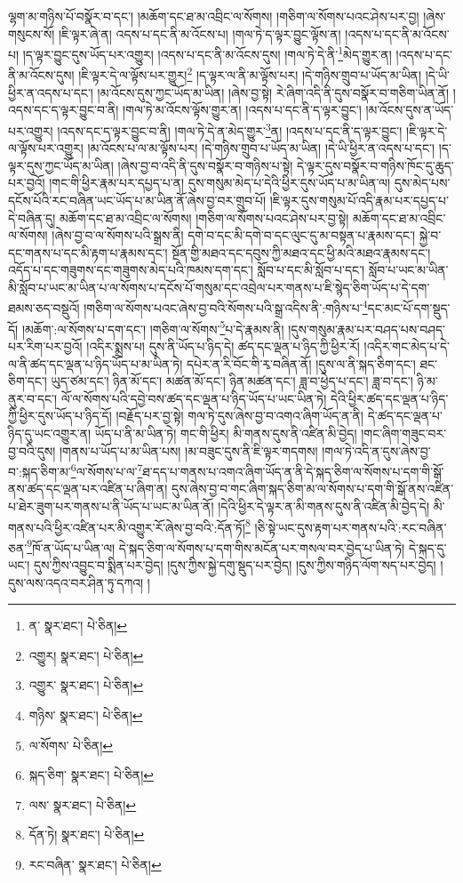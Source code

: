 ལྷག་མ་གཉིས་པོ་བསྣོར་བ་དང་། །མཆོག་དང་ཐ་མ་འབྲིང་ལ་སོགས། །གཅིག་ལ་སོགས་པའང་ཤེས་པར་བྱ། །ཞེས་གསུངས་སོ། །ཇི་ལྟར་ཞེ་ན། འདས་པ་དང་ནི་མ་འོངས་པ། །གལ་ཏེ་ད་ལྟར་བྱུང་ལྟོས་ན། །འདས་པ་དང་ནི་མ་འོངས་པ། །ད་ལྟར་བྱུང་དུས་ཡོད་པར་འགྱུར། །འདས་པ་དང་ནི་མ་འོངས་དུས། །གལ་ཏེ་དེ་ནི་\footnote{ན་  སྣར་ཐང་།  པེ་ཅིན། }མེད་གྱུར་ན། །འདས་པ་དང་ནི་མ་འོངས་དུས། །ཇི་ལྟར་དེ་ལ་ལྟོས་པར་གྱུར།\footnote{འགྱུར།  སྣར་ཐང་།  པེ་ཅིན། } །ད་ལྟར་ལ་ནི་མ་ལྟོས་པར། །དེ་གཉིས་གྲུབ་པ་ཡོད་མ་ཡིན། །དེ་ཡི་ཕྱིར་ན་འདས་པ་དང་། །མ་འོངས་དུས་ཀྱང་ཡོད་མ་ཡིན། །ཞེས་བྱ་སྟེ། རེ་ཞིག་འདི་ནི་དུས་བསྣོར་བ་གཅིག་ཡིན་ནོ། །འདས་དང་ད་ལྟར་བྱུང་བ་ནི། །གལ་ཏེ་མ་འོངས་ལྟོས་གྱུར་ན། །འདས་པ་དང་ནི་ད་ལྟར་བྱུང་། །མ་འོངས་དུས་ན་ཡོད་པར་འགྱུར། །འདས་དང་ད་ལྟར་བྱུང་བ་ནི། །གལ་ཏེ་དེ་ན་མེད་གྱུར་\footnote{འགྱུར་  སྣར་ཐང་།  པེ་ཅིན། }ན། །འདས་པ་དང་ནི་ད་ལྟར་བྱུང་། །ཇི་ལྟར་དེ་ལ་ལྟོས་པར་འགྱུར། །མ་འོངས་པ་ལ་མ་ལྟོས་པར། །དེ་གཉིས་གྲུབ་པ་ཡོད་མ་ཡིན། །དེ་ཡི་ཕྱིར་ན་འདས་པ་དང་། །ད་ལྟར་དུས་ཀྱང་ཡོད་མ་ཡིན། །ཞེས་བྱ་བ་འདི་ནི་དུས་བསྣོར་བ་གཉིས་པ་སྟེ། དེ་ལྟར་དུས་བསྣོར་བ་གཉིས་ཁོང་དུ་ཆུད་པར་བྱའོ། །གང་གི་ཕྱིར་རྣམ་པར་དཔྱད་པ་ན། དུས་གསུམ་མེད་པ་དེའི་ཕྱིར་དུས་ཡོད་པ་མ་ཡིན་ལ། དུས་མེད་པས་དངོས་པོའི་རང་བཞིན་ཡང་ཡོད་པ་མ་ཡིན་ནོ་ཞེས་བྱ་བར་གྲུབ་པོ། །ཇི་ལྟར་དུས་གསུམ་པོ་འདི་རྣམ་པར་དཔྱད་པ་དེ་བཞིན་དུ། མཆོག་དང་ཐ་མ་འབྲིང་ལ་སོགས། །གཅིག་ལ་སོགས་པའང་ཤེས་པར་བྱ་སྟེ། མཆོག་དང་ཐ་མ་འབྲིང་ལ་སོགས། །ཞེས་བྱ་བ་ལ་སོགས་པའི་སྒྲས་ནི། དགེ་བ་དང་མི་དགེ་བ་དང་ལུང་དུ་མ་བསྟན་པ་རྣམས་དང་། སྐྱེ་བ་དང་གནས་པ་དང་མི་རྟག་པ་རྣམས་དང་། སྔོན་གྱི་མཐའ་དང་དབུས་ཀྱི་མཐའ་དང་ཕྱི་མའི་མཐའ་རྣམས་དང་། འདོད་པ་དང་གཟུགས་དང་གཟུགས་མེད་པའི་ཁམས་དག་དང་། སློབ་པ་དང་མི་སློབ་པ་དང་། སློབ་པ་ཡང་མ་ཡིན་མི་སློབ་པ་ཡང་མ་ཡིན་པ་ལ་སོགས་པ་དངོས་པོ་གསུམ་དང་འབྲེལ་པར་གནས་པ་ཇི་སྙེད་ཅིག་ཡོད་པ་དེ་དག་ཐམས་ཅད་བསྡུའོ། །གཅིག་ལ་སོགས་པའང་ཞེས་བྱ་བའི་སོགས་པའི་སྒྲ་འདིས་ནི་:གཉིས་པ་\footnote{གཉིས་  སྣར་ཐང་།  པེ་ཅིན། }དང་མང་པོ་དག་སྡུད་དོ། །མཆོག་:ལ་སོགས་པ་དག་དང་། །གཅིག་ལ་སོགས་\footnote{ལ་སོགས་  པེ་ཅིན། }པ་དེ་རྣམས་ནི། །དུས་གསུམ་རྣམ་པར་བཤད་པས་བཤད་པར་རིག་པར་བྱའོ། །འདིར་སྨྲས་པ། དུས་ནི་ཡོད་པ་ཉིད་དེ། ཚད་དང་ལྡན་པ་ཉིད་ཀྱི་ཕྱིར་རོ། །འདིར་གང་མེད་པ་དེ་ལ་ནི་ཚད་དང་ལྡན་པ་ཉིད་ཡོད་པ་མ་ཡིན་ཏེ། དཔེར་ན་རི་བོང་གི་རྭ་བཞིན་ནོ། །དུས་ལ་ནི་སྐད་ཅིག་དང་། ཐང་ཅིག་དང་། ཡུད་ཙམ་དང་། ཉིན་མོ་དང་། མཚན་མོ་དང་། ཉིན་མཚན་དང་། ཟླ་བ་ཕྱེད་པ་དང་། ཟླ་བ་དང་། ཉི་མ་ནུར་བ་དང་། ལོ་ལ་སོགས་པའི་དབྱེ་བས་ཚད་དང་ལྡན་པ་ཉིད་ཡོད་པ་ཡང་ཡིན་ཏེ། དེའི་ཕྱིར་ཚད་དང་ལྡན་པ་ཉིད་ཀྱི་ཕྱིར་དུས་ཡོད་པ་ཉིད་དོ། །བརྗོད་པར་བྱ་སྟེ། གལ་ཏེ་དུས་ཞེས་བྱ་བ་འགའ་ཞིག་ཡོད་ན་ནི། དེ་ཚད་དང་ལྡན་པ་ཉིད་དུ་ཡང་འགྱུར་ན། ཡོད་པ་ནི་མ་ཡིན་ཏེ། གང་གི་ཕྱིར། མི་གནས་དུས་ནི་འཛིན་མི་བྱེད། །གང་ཞིག་གཟུང་བར་བྱ་བའི་དུས། །གནས་པ་ཡོད་པ་མ་ཡིན་པས། །མ་བཟུང་དུས་ནི་ཇི་ལྟར་གདགས། །གལ་ཏེ་འདི་ན་དུས་ཞེས་བྱ་བ་:སྐད་ཅིག་མ་\footnote{སྐད་ཅིག་  སྣར་ཐང་།  པེ་ཅིན། }ལ་སོགས་པ་ལ་\footnote{ལས་  སྣར་ཐང་།  པེ་ཅིན། }ཐ་དད་པ་གནས་པ་འགའ་ཞིག་ཡོད་ན་ནི་དེ་སྐད་ཅིག་ལ་སོགས་པ་དག་གི་སྒོ་ནས་ཚད་དང་ལྡན་པར་འཛིན་པ་ཞིག་ན། དུས་ཞེས་བྱ་བ་གང་ཞིག་སྐད་ཅིག་མ་ལ་སོགས་པ་དག་གི་སྒོ་ནས་འཛིན་པ་ཐེར་ཟུག་པར་གནས་པ་ནི་ཡོད་པ་ཡང་མ་ཡིན་ནོ། །དེའི་ཕྱིར་དེ་ལྟར་ན་མི་གནས་དུས་ནི་འཛིན་མི་བྱེད་དེ། མི་གནས་པའི་ཕྱིར་འཛིན་པར་མི་འགྱུར་རོ་ཞེས་བྱ་བའི་:དོན་ཏོ།\footnote{དོན་ཏེ།  སྣར་ཐང་།  པེ་ཅིན། } །ཅི་སྟེ་ཡང་དུས་རྟག་པར་གནས་པའི་:རང་བཞིན་ཅན་\footnote{རང་བཞིན་  སྣར་ཐང་།  པེ་ཅིན། }ཁོ་ན་ཡོད་པ་ཡིན་ལ། དེ་སྐད་ཅིག་ལ་སོགས་པ་དག་གིས་མངོན་པར་གསལ་བར་བྱེད་པ་ཡིན་ཏེ། དེ་སྐད་དུ་ཡང་། དུས་ཀྱིས་འབྱུང་བ་སྨིན་པར་བྱེད། །དུས་ཀྱིས་སྐྱེ་དགུ་སྡུད་པར་བྱེད། །དུས་ཀྱིས་གཉིད་ལོག་སད་པར་བྱེད། །དུས་ལས་འདའ་བར་ཤིན་ཏུ་དཀའ། །
